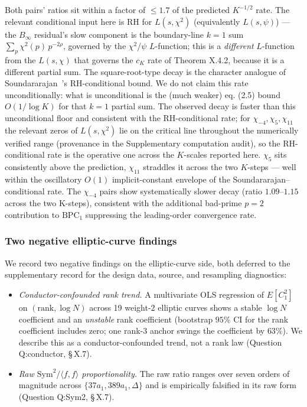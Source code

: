 Both pairs' ratios sit within a factor of \(\le 1.7\) of the
predicted \(K^{-1/2}\) rate. The relevant conditional input here is
RH for \(L(s, \chi^2)\) (equivalently \(L(s,\psi)\)) --- the \(B_\infty\)
residual's slow component is the boundary-line \(k = 1\) sum
\(\sum_p \chi^2(p)\,p^{-2\rho}\), governed by the \(\chi^2\)/\(\psi\)
\(L\)-function; this is a \emph{different} \(L\)-function from the
\(L(s,\chi)\) that governs the \(c_K\) rate of Theorem X.4.2, because
it is a different partial sum. The square-root-type decay is the
character analogue of Soundararajan~\cite{Soundararajan2009}'s RH-conditional bound.
We do not claim this rate unconditionally: what is unconditional
is the (much weaker) \cite{Akatsuka2017EulerProduct} eq. (2.5) bound \(O(1/\log K)\)
for that \(k = 1\) partial sum. The observed decay is faster than
this unconditional floor and consistent with the RH-conditional
rate; for \(\chi_{-4}, \chi_5, \chi_{11}\) the relevant zeros of
\(L(s,\chi^2)\) lie on the critical line throughout the numerically
verified range (provenance in the Supplementary computation
audit), so the RH-conditional rate is the operative one across
the \(K\)-scales reported here.
\(\chi_5\) sits consistently above the prediction, \(\chi_{11}\)
straddles it across the two \(K\)-steps --- well within the
oscillatory \(O(1)\) implicit-constant envelope of the
Soundararajan--conditional rate. The \(\chi_{-4}\) pairs show systematically slower decay
(ratio \(1.09\)--\(1.15\) across the two K-steps), consistent with the
additional bad-prime \(p = 2\) contribution to \(\mathrm{BPC}_1\)
suppressing the leading-order convergence rate.

\subsubsection{Two negative elliptic-curve findings}

We record two negative findings on the elliptic-curve side, both
deferred to the supplementary record for the design data, source,
and resampling diagnostics:

\begin{itemize}
\item
  \emph{Conductor-confounded rank trend.} A multivariate OLS regression
  of \(E[C_1^2]\) on \((\mathrm{rank}, \log N)\) across 19 weight-\(2\)
  elliptic curves shows a stable \(\log N\) coefficient and an
  \emph{unstable} rank coefficient (bootstrap \(95\%\) CI for the rank
  coefficient includes zero; one rank-\(3\) anchor swings the
  coefficient by \(63\%\)). We describe this as a
  conductor-confounded trend, not a rank law (Question Q:conductor,
  \S\,X.7).
\item
  \emph{Raw \(\mathrm{Sym}^2 / \langle f, f \rangle\) proportionality.}
  The raw ratio ranges over seven orders of magnitude across
  \(\{37a_1, 389a_1, \Delta\}\) and is empirically falsified in its
  raw form (Question Q:Sym2, \S\,X.7).
\end{itemize}

